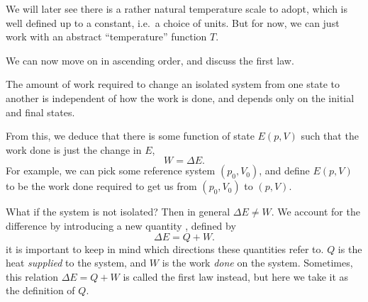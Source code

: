 \documentclass[a4paper]{article}
\begin{document}
We will later see there is a rather natural temperature scale to adopt, which is well defined up to a constant, i.e.\ a choice of units. But for now, we can just work with an abstract ``temperature'' function $T$.

%
%

We can now move on in ascending order, and discuss the first law.

\begin{law}
  The amount of work required to change an isolated system from one state to another is independent of how the work is done, and depends only on the initial and final states.
\end{law}

From this, we deduce that there is some function of state $E(p, V)$ such that the work done is just the change in $E$,
\[
  W = \Delta E.
\]
For example, we can pick some reference system $(p_0, V_0)$, and define $E(p, V)$ to be the work done required to get us from $(p_0, V_0)$ to $(p, V)$.

What if the system is not isolated? Then in general $\Delta E \not= W$. We account for the difference by introducing a new quantity , defined by
\[
  \Delta E = Q + W.
\]
it is important to keep in mind which directions these quantities refer to. $Q$ is the heat \emph{supplied} to the system, and $W$ is the work \emph{done} on the system. Sometimes, this relation $\Delta E = Q + W$ is called the first law instead, but here we take it as the definition of $Q$.
\end{document}
